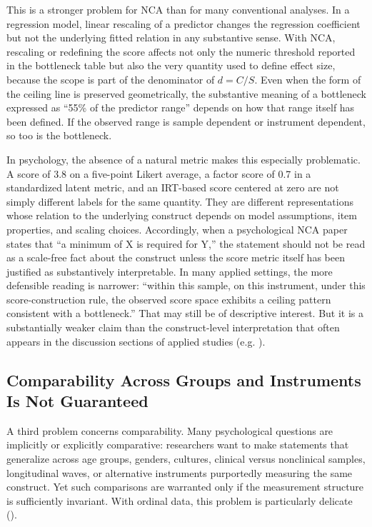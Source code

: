 \documentclass[
  man,
  longtable,
  nolmodern,
  notxfonts,
  notimes,
  colorlinks=true,linkcolor=blue,citecolor=blue,urlcolor=blue]{apa7}
\begin{document}
This is a stronger problem for NCA than for many conventional analyses.
In a regression model, linear rescaling of a predictor changes the
regression coefficient but not the underlying fitted relation in any
substantive sense. With NCA, rescaling or redefining the score affects
not only the numeric threshold reported in the bottleneck table but also
the very quantity used to define effect size, because the scope is part
of the denominator of \(d = C/S\). Even when the form of the ceiling
line is preserved geometrically, the substantive meaning of a bottleneck
expressed as ``55\% of the predictor range'' depends on how that range
itself has been defined. If the observed range is sample dependent or
instrument dependent, so too is the bottleneck.

In psychology, the absence of a natural metric makes this especially
problematic. A score of 3.8 on a five-point Likert average, a factor
score of 0.7 in a standardized latent metric, and an IRT-based score
centered at zero are not simply different labels for the same quantity.
They are different representations whose relation to the underlying
construct depends on model assumptions, item properties, and scaling
choices. Accordingly, when a psychological NCA paper states that ``a
minimum of X is required for Y,'' the statement should not be read as a
scale-free fact about the construct unless the score metric itself has
been justified as substantively interpretable. In many applied settings,
the more defensible reading is narrower: ``within this sample, on this
instrument, under this score-construction rule, the observed score space
exhibits a ceiling pattern consistent with a bottleneck.'' That may
still be of descriptive interest. But it is a substantially weaker claim
than the construct-level interpretation that often appears in the
discussion sections of applied studies (e.g.
).

\subsection{Comparability Across Groups and Instruments Is Not
Guaranteed}\label{comparability-across-groups-and-instruments-is-not-guaranteed}

A third problem concerns comparability. Many psychological questions are
implicitly or explicitly comparative: researchers want to make
statements that generalize across age groups, genders, cultures,
clinical versus nonclinical samples, longitudinal waves, or alternative
instruments purportedly measuring the same construct. Yet such
comparisons are warranted only if the measurement structure is
sufficiently invariant. With ordinal data, this problem is particularly
delicate ().
\end{document}
